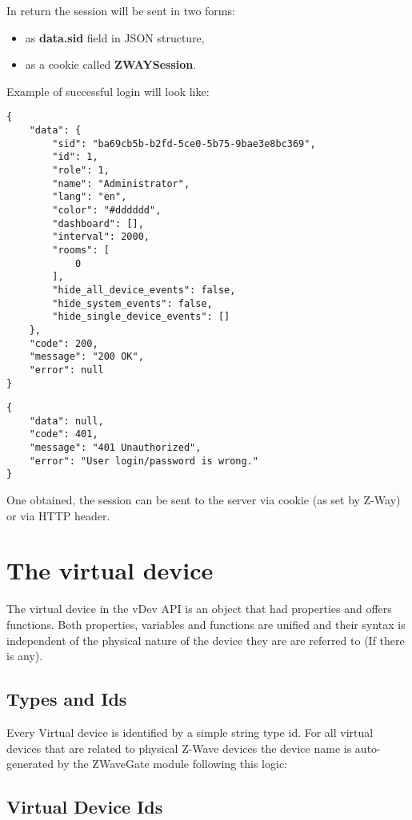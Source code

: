 In return the session will be sent in two forms:
\begin{itemize}
\item as \textbf{data.sid} field in JSON structure,
\item as a cookie called \textbf{ZWAYSession}.
\end{itemize}

Example of successful login will look like:
\begin{lstlisting}[caption=Successful login reply]
{
    "data": {
        "sid": "ba69cb5b-b2fd-5ce0-5b75-9bae3e8bc369",
        "id": 1,
        "role": 1,
        "name": "Administrator",
        "lang": "en",
        "color": "#dddddd",
        "dashboard": [],
        "interval": 2000,
        "rooms": [
            0
        ],
        "hide_all_device_events": false,
        "hide_system_events": false,
        "hide_single_device_events": []
    },
    "code": 200,
    "message": "200 OK",
    "error": null
}
\end{lstlisting}

\begin{lstlisting}[caption=Wrong login/password reply]
{
    "data": null,
    "code": 401,
    "message": "401 Unauthorized",
    "error": "User login/password is wrong."
}
\end{lstlisting}

One obtained, the session can be sent to the server via cookie (as set by
Z-Way) or via HTTP header.

\section{The virtual device}

The virtual device in the vDev API is an object that had properties and offers functions. 
Both properties, variables and functions are unified and their syntax is independent of 
the physical nature of the device they are are referred to (If there is any).

\subsection{Types and Ids}

Every Virtual device is identified by a simple string type id. For all virtual devices 
that are related to physical Z-Wave devices the device name is auto-generated by the 
ZWaveGate module following this logic:


\subsection{Virtual Device Ids}

